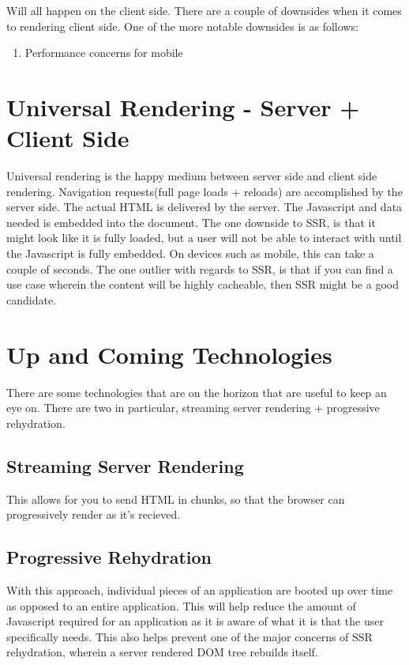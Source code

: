 Will all happen on the client side. There are a couple of downsides when it comes to rendering client side. One of the more notable downsides is as follows: 
\begin{enumerate}
  \item Performance concerns for mobile
\end{enumerate}


\section{Universal Rendering - Server + Client Side}
Universal rendering is the happy medium between server side and client side rendering. Navigation requests(full page loads + reloads) are accomplished by the server side. The actual HTML is delivered by the server. The Javascript and data needed is embedded into the document. The one downside to SSR, is that it might look like it is fully loaded, but a user will not be able to interact with until the Javascript is fully embedded. On devices such as mobile, this can take a couple of seconds. The one outlier with regards to SSR, is that if you can find a use case wherein the content will be highly cacheable, then SSR might be a good candidate. 

\section{Up and Coming Technologies}
There are some technologies that are on the horizon that are useful to keep an eye on. There are two in particular, streaming server rendering + progressive rehydration.

\subsection{Streaming Server Rendering}
This allows for you to send HTML in chunks, so that the browser can progressively render as it's recieved. 

\subsection{Progressive Rehydration}
With this approach, individual pieces of an application are booted up over time as opposed to an entire application. This will help reduce the amount of Javascript required for an application as it is aware of what it is that the user specifically needs. This also helps prevent one of the major concerns of SSR rehydration, wherein a server rendered DOM tree rebuilds itself. 
